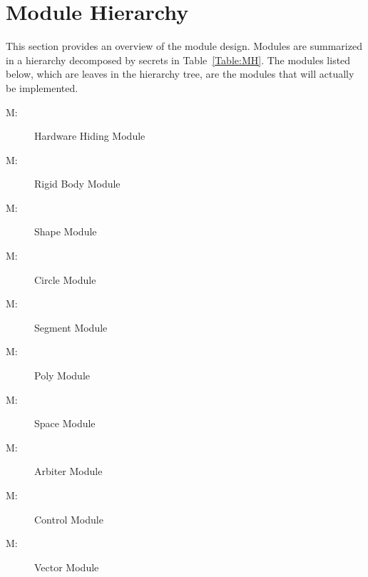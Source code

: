 \documentclass[12pt]{article}
\newcounter{modnum}
\newcommand{\mthemodnum}{M\themodnum}
\begin{document}
\section{Module Hierarchy}
\label{Sec:MH}
This section provides an overview of the module design. Modules are summarized in a hierarchy decomposed by secrets in Table~\ref{Table:MH}. The modules listed below, which are leaves in the hierarchy tree, are the modules that will actually be implemented.
\begin{description}
\item[\mthemodnum\label{Mhardwarehiding}:]Hardware Hiding Module
\end{description}
\begin{description}
\item[\mthemodnum\label{Mrigidbody}:]Rigid Body Module
\end{description}
\begin{description}
\item[\mthemodnum\label{Mshape}:]Shape Module
\end{description}
\begin{description}
\item[\mthemodnum\label{Mcircle}:]Circle Module
\end{description}
\begin{description}
\item[\mthemodnum\label{Msegment}:]Segment Module
\end{description}
\begin{description}
\item[\mthemodnum\label{Mpoly}:]Poly Module
\end{description}
\begin{description}
\item[\mthemodnum\label{Mspace}:]Space Module
\end{description}
\begin{description}
\item[\mthemodnum\label{Marbiter}:]Arbiter Module
\end{description}
\begin{description}
\item[\mthemodnum\label{Mcontrol}:]Control Module
\end{description}
\begin{description}
\item[\mthemodnum\label{Mvector}:]Vector Module
\end{description}
\end{document}
